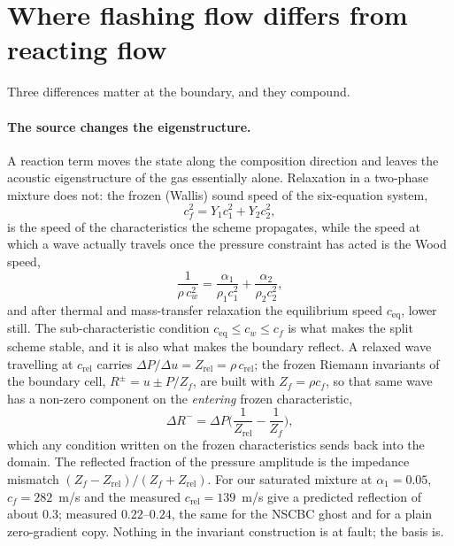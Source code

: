 \documentclass[11pt,a4paper]{article}
\newcommand{\ceq}{c_{\mathrm{eq}}}
\newcommand{\cf}{c_{f}}
\newcommand{\cw}{c_{w}}
\begin{document}
\section{Where flashing flow differs from reacting flow}

Three differences matter at the boundary, and they compound.

\paragraph{The source changes the eigenstructure.}  A reaction term
moves the state along the composition direction and leaves the acoustic
eigenstructure of the gas essentially alone.  Relaxation in a two-phase
mixture does not: the frozen (Wallis) sound speed of the six-equation
system,
\begin{equation}
  \cf^2 = Y_1 c_1^2 + Y_2 c_2^2 ,
\end{equation}
is the speed of the characteristics the scheme propagates, while the
speed at which a wave actually travels once the pressure constraint has
acted is the Wood speed,
\begin{equation}
  \frac{1}{\rho\,\cw^2} = \frac{\alpha_1}{\rho_1 c_1^2} + \frac{\alpha_2}{\rho_2 c_2^2},
\end{equation}
and after thermal and mass-transfer relaxation the equilibrium speed
$\ceq$, lower still.  The sub-characteristic condition
$\ceq \le \cw \le \cf$ is what makes the split scheme stable, and it is
also what makes the boundary reflect.  A relaxed wave travelling at
$c_{\mathrm{rel}}$ carries $\Delta P/\Delta u = Z_{\mathrm{rel}} =
\rho\,c_{\mathrm{rel}}$; the frozen Riemann invariants of the boundary
cell, $R^\pm = u \pm P/Z_f$, are built with $Z_f = \rho\cf$, so that
same wave has a non-zero component on the \emph{entering} frozen
characteristic,
\begin{equation}
  \Delta R^- = \Delta P\Big(\frac{1}{Z_{\mathrm{rel}}} - \frac{1}{Z_f}\Big),
\end{equation}
which any condition written on the frozen characteristics sends back
into the domain.  The reflected fraction of the pressure amplitude is
the impedance mismatch $(Z_f - Z_{\mathrm{rel}})/(Z_f + Z_{\mathrm{rel}})$.
For our saturated mixture at $\alpha_1 = 0.05$, $\cf = 282$~m/s and the
measured $c_{\mathrm{rel}} = 139$~m/s give a predicted reflection of
about $0.3$; measured $0.22$--$0.24$, the same for the NSCBC ghost and
for a plain zero-gradient copy.  Nothing in the invariant construction
is at fault; the basis is.
\end{document}
